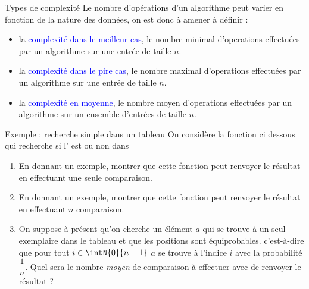 \documentclass[10pt]{beamer}
\begin{document}
\begin{frame}[fragile]{\Ctitle}{\stitle}
    \begin{alertblock}{Types de complexité}
    Le nombre d'opérations d'un algorithme peut varier en fonction de la nature des données, on est donc à amener à définir :
        \begin{itemize}
            \item<4-> la \textcolor{blue}{complexité dans le meilleur cas}, le nombre minimal d'operations effectuées par un algorithme sur une entrée de taille $n$.
            \item<5-> la \textcolor{blue}{complexité dans le pire cas}, le nombre maximal d'operations effectuées par un algorithme sur une entrée de taille $n$.
            \item<6-> la \textcolor{blue}{complexité en moyenne}, le nombre moyen d'operations effectuées par un algorithme sur un ensemble d'entrées de taille $n$.
        \end{itemize}
    \end{alertblock}
\end{frame} 



\begin{frame}[fragile]{\Ctitle}{\stitle}
    \begin{exampleblock}{Exemple : recherche simple dans un tableau}
        {\small On considère la fonction ci dessous qui recherche si l' est ou non dans {}}
    \begin{enumerate}
        \item<3-> {\small En donnant un exemple, montrer que cette fonction peut renvoyer le résultat en effectuant une seule comparaison.}
        \item<4-> {\small En donnant un exemple, montrer que cette fonction peut renvoyer le résultat en effectuant $n$ comparaison.}
        \item<5-> {\small On suppose à présent qu'on cherche un élément $a$ qui se trouve à un seul exemplaire dans le tableau et que les positions sont équiprobables. c'est-à-dire que pour tout $i \in \intN{0}{n-1}$ $a$ se trouve à l'indice $i$ avec la probabilité $\dfrac{1}{n}$. Quel sera le nombre \textit{moyen} de comparaison à effectuer avec de renvoyer le résultat ?}
    \end{enumerate}
\end{exampleblock}
\end{frame}
\end{document}
